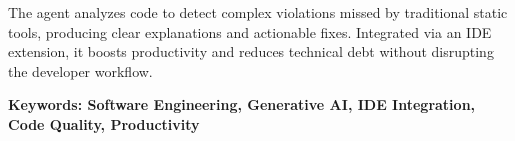 The agent analyzes code to detect complex violations missed by traditional static tools, producing clear explanations and actionable fixes. Integrated via an IDE extension, it boosts productivity and reduces technical debt without disrupting the developer workflow.

\textbf{Keywords: Software Engineering, Generative AI, IDE Integration, Code Quality, Productivity}

\endgroup

